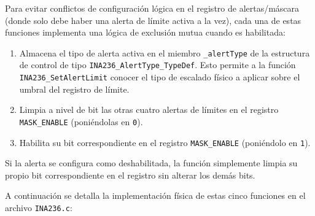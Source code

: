 \documentclass[
10pt, %
a4paper, %
oneside, %
headinclude,footinclude, %
BCOR5mm, %
]{scrartcl}
\begin{document}
Para evitar conflictos de configuración lógica en el registro de alertas/máscara (donde solo debe haber una alerta de límite activa a la vez), cada una de estas funciones implementa una lógica de exclusión mutua cuando es habilitada:
\begin{enumerate}
	\item Almacena el tipo de alerta activa en el miembro \texttt{\_alertType} de la estructura de control de tipo \texttt{INA236\_AlertType\_TypeDef}. Esto permite a la función \texttt{INA236\_SetAlertLimit} conocer el tipo de escalado físico a aplicar sobre el umbral del registro de límite.
	\item Limpia a nivel de bit las otras cuatro alertas de límites en el registro \texttt{MASK\_ENABLE} (poniéndolas en \texttt{0}).
	\item Habilita su bit correspondiente en el registro \texttt{MASK\_ENABLE} (poniéndolo en \texttt{1}).
\end{enumerate}
Si la alerta se configura como deshabilitada, la función simplemente limpia su propio bit correspondiente en el registro sin alterar los demás bits.

A continuación se detalla la implementación física de estas cinco funciones en el archivo \texttt{INA236.c}:
\end{document}
